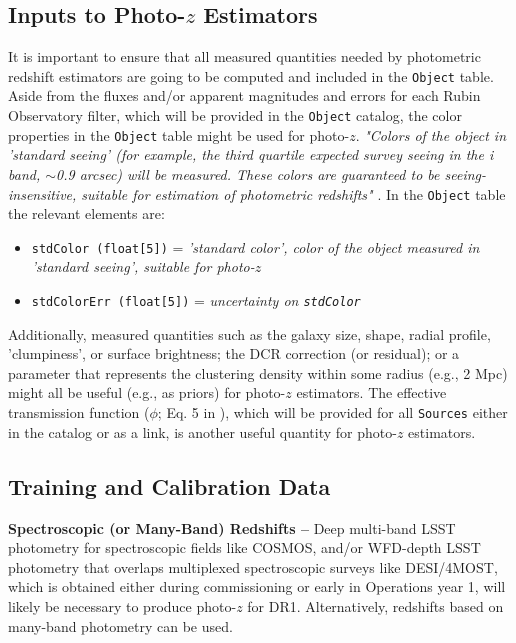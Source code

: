 \documentclass[DM,authoryear,toc]{lsstdoc}
\begin{document}
\begin{enumerate}
\subsection{Inputs to Photo-$z$ Estimators}\label{ssec:dp_objvals}

It is important to ensure that all measured quantities needed by photometric redshift estimators are going to be computed and included in the {\tt Object} table. 
Aside from the fluxes and/or apparent magnitudes and errors for each Rubin Observatory filter, which will be provided in the {\tt Object} catalog, the color properties in the {\tt Object} table might be used for photo-$z$. {\it "Colors of the object in 'standard seeing' (for example, the third quartile expected survey seeing in the i band, $\sim$0.9 arcsec) will be measured. These colors are guaranteed to be seeing-insensitive, suitable for estimation of photometric redshifts"} . In the {\tt Object} table the relevant elements are:
\vspace{-15pt}
\begin{itemize}
\item \texttt{stdColor (float[5])} = {\it 'standard color', color of the object measured in 'standard seeing', suitable for photo-$z$}
\item \texttt{stdColorErr (float[5])} = {\it uncertainty on \texttt{stdColor}}
\end{itemize}

Additionally, measured quantities such as the galaxy size, shape, radial profile, 'clumpiness', or surface brightness; the DCR correction (or residual); or a parameter that represents the clustering density within some radius (e.g., 2 Mpc) might all be useful (e.g., as priors) for photo-$z$ estimators. The effective transmission function ($\phi$; Eq. 5 in ), which will be provided for all {\tt Sources} either in the catalog or as a link, is another useful quantity for photo-$z$ estimators.

\subsection{Training and Calibration Data}\label{ssec:dp_calib}

{\bf Spectroscopic (or Many-Band) Redshifts --}
Deep multi-band LSST photometry for spectroscopic fields like COSMOS, and/or WFD-depth LSST photometry that overlaps multiplexed spectroscopic surveys like DESI/4MOST, which is obtained either during commissioning or early in Operations year 1, will likely be necessary to produce photo-$z$ for DR1.
Alternatively, redshifts based on many-band photometry can be used.


\end{enumerate}
\end{document}
